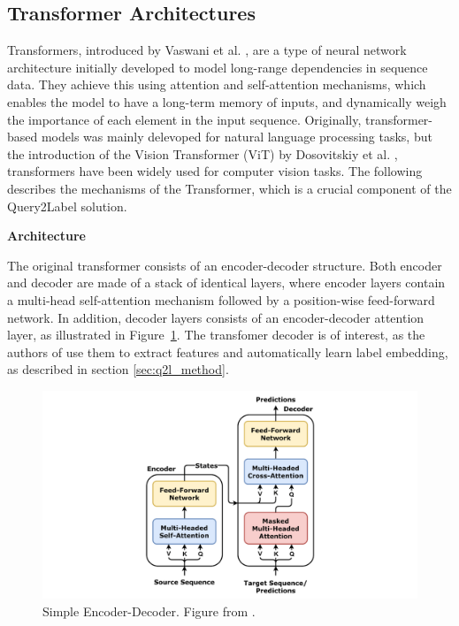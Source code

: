 \documentclass[lettersize,journal]{IEEEtran}
\renewcommand{\paragraph}[1]{%
  \vspace{1.5ex}\textbf{#1}\quad
}
\begin{document}
\subsection{Transformer Architectures}
\label{sec:transformers}
Transformers, introduced by Vaswani et al. \cite{vaswani2023attentionneed}, are a type of neural network architecture initially developed to model long-range dependencies in sequence data. They achieve this using attention and self-attention mechanisms, which enables the model to have a long-term memory of inputs, and dynamically weigh the importance of each element in the input sequence. Originally, transformer-based models was mainly delevoped for natural language processing tasks, but the introduction of the Vision Transformer (ViT) by Dosovitskiy et al. \cite{dosovitskiy2021imageworth16x16words}, transformers have been widely used for computer vision tasks. The following describes the mechanisms of the Transformer, which is a crucial component of the Query2Label solution.


\paragraph{Architecture}
The original transformer consists of an encoder-decoder structure. Both encoder and decoder are made of a stack of identical layers, where encoder layers contain a multi-head self-attention mechanism followed by a position-wise feed-forward network. In addition, decoder layers consists of an encoder-decoder attention layer, as illustrated in Figure~\ref{fig:encoder_decoder}. The transfomer decoder is of interest, as the authors of \cite{Query2Label} use them to extract features and automatically learn label embedding, as described in section \ref{sec:q2l_method}.

\begin{figure}[t]
    \centering
    \includegraphics[width=\linewidth]{images/Transformer,_one_encoder-decoder_block.png}
    \caption{Simple Encoder-Decoder. Figure from \cite{godoy_dl_visuals}.}
    \label{fig:encoder_decoder}
\end{figure}
\end{document}
